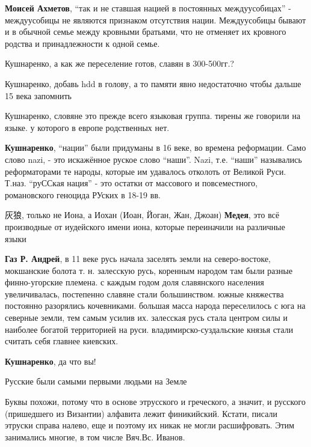 \begin{itemize}
\begin{itemize}
\textbf{Моисей Ахметов}, \enquote{так и не ставшая нацией в постоянных междуусобицах} -
междуусобицы не являются признаком отсутствия нации. Междуусобицы бывают и в
обычной семье между кровными братьями, что не отменяет их кровного родства и
принадлежности к одной семье.


Кушнаренко, а как же переселение готов, славян в 300-500гг.?

Кушнаренко, добавь hdd в голову, а то памяти явно недостаточно чтобы дальше 15 века запомнить


Кушнаренко, словяне это прежде всего языковая группа. тирены же говорили на
языке. у которого в европе родственных нет.

\textbf{Кушнаренко}, \enquote{нации} были придуманы в 16 веке, во времена реформации. Само слово
nazi, - это искажённое руское слово \enquote{наши}. Nazi, т.е. \enquote{наши} назывались
реформаторами те народы, которые им удавалось отколоть от Великой Руси. Т.наз.
\enquote{руССкая нация} - это остатки от массового и повсеместного, романовского
геноцида РУских в 18-19 вв.


灰狼, только не Иона, а Иохан (Иоан, Йоган, Жан, Джоан)
\textbf{Медея}, это всё производные от иудейского имени иона, которые переиначили на различные языки

\textbf{Газ Р. Андрей}, в 11 веке русь начала заселять земли на северо-востоке, мокшанские болота т. н. залесскую русь, коренным народом там были разные финно-угорские племена. с каждым годом доля славянского населения увеличивалась, постепенно славяне стали большинством. южные княжества постоянно разорялись кочевниками. большая масса народа переселилось с юга на северные земли, тем самым усилив их. залесская русь стала центром силы и наиболее богатой территорией на руси. владимирско-суздальские князья стали считать себя главнее киевских.

\textbf{Кушнаренко}, да что вы!

Русские были самыми первыми людьми на Земле

\end{itemize} %


Буквы похожи, потому что в основе этрусского и греческого, а значит, и русского
(пришедшего из Византии) алфавита лежит финикийский. Кстати, писали этруски
справа налево, еще и поэтому их никак не могли расшифровать. Этим занимались
многие, в том числе Вяч.Вс. Иванов.

\end{itemize} %
